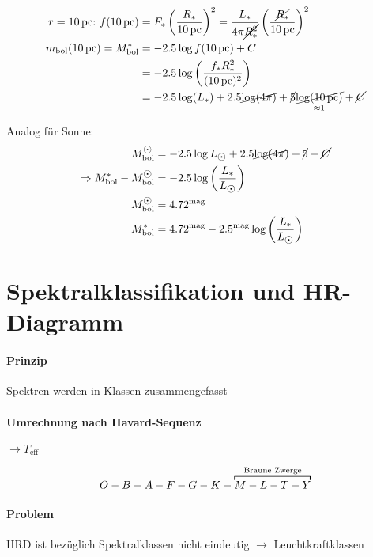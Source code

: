 \begin{align*}
    r = 10\,{\mathrm{pc}}{:}\ f(10\,{\mathrm{pc}}) &= F_*\left(\frac{R_*}{10\,{\mathrm{pc}}}\right)^2 = \frac{L_*}{4 \pi \cancel{R_*^2}} \left(\frac{\cancel{R_*}}{10\,{\mathrm{pc}}}\right)^2 \\
    m_{\mathrm{bol}} (10\,{\mathrm{pc}}) = M_{\mathrm{bol}}^{*} &= -2.5 \log f (10\,{\mathrm{pc}}) + C \\
                                                          &= -2.5 \log \left(\frac{f_* R_*^2}{(10\,{\mathrm{pc}})^2}\right) \\
                                                          &= -2.5 \log (L_*) + 2.5 \cancel{\log(4\pi)} + \cancel{5} \underset{\approx 1}{\cancel{\log(10\,{\mathrm{pc}})}} + \cancel{C}
\end{align*}

Analog für Sonne:
\begin{align*}
    M_{\mathrm{bol}}^{\astrosun} &= -2.5 \log L_{\astrosun} + 2.5 \cancel{\log(4\pi)} + \cancel{5} + \cancel{C} \\
    \Rightarrow M_{\mathrm{bol}}^* - M_{\mathrm{bol}}^{\astrosun} &= -2.5 \log\left(\frac{L_*}{L_{\astrosun}}\right) \\
    M_{\mathrm{bol}}^{\astrosun} &= 4.72\magnitude \\
    M_{\mathrm{bol}}^* &= 4.72\magnitude - 2.5\magnitude \log\left(\frac{L_*}{L_{\astrosun}}\right)
\end{align*}

\section{Spektralklassifikation und HR-Diagramm}
\paragraph{Prinzip} Spektren werden in Klassen zusammengefasst

\paragraph{Umrechnung nach Havard-Sequenz} $\rightarrow T_{\mathrm{eff}}$

\[ O - B - A - F - G - K - \overbracket{M - L - T - Y}^{\mathclap{\text{Braune Zwerge}}} \]


\paragraph{Problem} HRD ist bezüglich Spektralklassen nicht eindeutig $\rightarrow$ Leuchtkraftklassen


